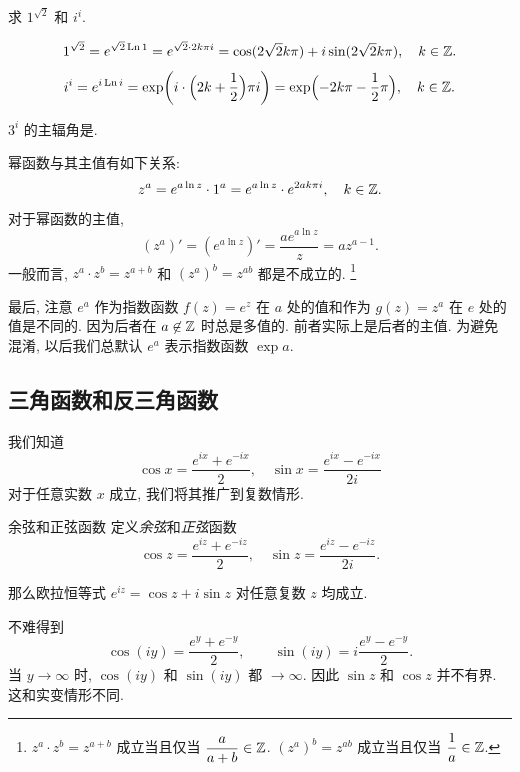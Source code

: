 \begin{example}
	求 $1^{\sqrt 2}$ 和 $i^i$.
\end{example}
\begin{solution}
	\[
    1^{\sqrt2}=e^{\sqrt2\operatorname{Ln}1}
      =e^{\sqrt 2\cdot 2k\pi i}
      =\cos(2\sqrt 2k\pi)+i\sin(2\sqrt 2k\pi), \quad k\in{\mathbb{Z}}.
  \]
	\[
    i^i=e^{i\operatorname{Ln} i}
      =\exp\biggl(i\cdot\Bigl(2k+\frac{1}{2}\Bigr)\pi i\biggr)
			=\exp\Bigl(-2k\pi-\frac{1}{2}\pi\Bigr), \quad k\in{\mathbb{Z}}.
  \]
\end{solution}

\begin{exercise}
	$3^i$ 的主辐角是\fillblank{}.
\end{exercise}

幂函数与其主值有如下关系:
\[
  z^a=e^{a\ln z}\cdot 1^a
    =e^{a\ln z}\cdot e^{2ak\pi i},\quad k\in{\mathbb{Z}}.
\]
对于幂函数的主值,
\[(z^a)'=\left(e^{a\ln z}\right)'=\frac{ae^{a\ln z}}z=az^{a-1}.\]
一般而言, $z^a\cdot z^b=z^{a+b}$ 和 $(z^a)^b=z^{ab}$ 都是不成立的.
\footnote{$z^a\cdot z^b=z^{a+b}$ 成立当且仅当 $\dfrac{a}{a+b}\in{\mathbb{Z}}$. $(z^a)^b=z^{ab}$ 成立当且仅当 $\dfrac1a\in{\mathbb{Z}}$.}

最后, 注意 $e^a$ 作为指数函数 $f(z)=e^z$ 在 $a$ 处的值和作为 $g(z)=z^a$ 在 $e$ 处的值是\alert{不同}的.
因为后者在 $a\not\in{\mathbb{Z}}$ 时总是多值的.
前者实际上是后者的主值.
为避免混淆, 以后我们总\alert{默认 $e^a$ 表示指数函数 $\exp a$}.


\subsection{三角函数和反三角函数}

我们知道
  \[\cos x=\frac{e^{ix}+e^{-ix}}2,\quad
  \sin x=\frac{e^{ix}-e^{-ix}}{2i}\]
对于任意实数 $x$ 成立,
我们将其推广到复数情形.

\begin{definition}{余弦和正弦函数}
	定义\emph{余弦}和\emph{正弦}函数
	\[\cos z=\frac{e^{iz}+e^{-iz}}2,\quad
	\sin z=\frac{e^{iz}-e^{-iz}}{2i}.\]
\end{definition}
那么欧拉恒等式 \alert{$e^{iz}=\cos z+i\sin z$ 对任意复数 $z$ 均成立}.

不难得到
\[
	\cos(iy)=\dfrac{e^y+e^{-y}}2,\qquad
	{\sin(iy)=i\dfrac{e^y-e^{-y}}2.}
\]
当 $y\to\infty$ 时, $\cos(iy)$ 和 $\sin(iy)$ 都 $\to\infty$.
因此 \alert{$\sin z$ 和 $\cos z$ 并不有界}. 
这和实变情形不同.

